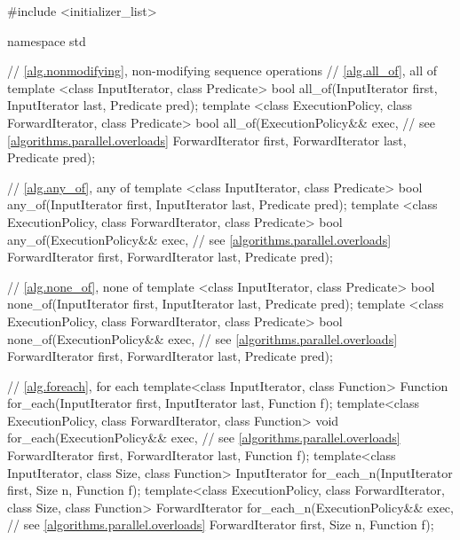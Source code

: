 \begin{codeblock}
#include <initializer_list>

namespace std {
  // \ref{alg.nonmodifying}, non-modifying sequence operations
  // \ref{alg.all_of}, all of
  template <class InputIterator, class Predicate>
    bool all_of(InputIterator first, InputIterator last, Predicate pred);
  template <class ExecutionPolicy, class ForwardIterator, class Predicate>
    bool all_of(ExecutionPolicy&& exec, // see \ref{algorithms.parallel.overloads}
                ForwardIterator first, ForwardIterator last, Predicate pred);

  // \ref{alg.any_of}, any of
  template <class InputIterator, class Predicate>
    bool any_of(InputIterator first, InputIterator last, Predicate pred);
  template <class ExecutionPolicy, class ForwardIterator, class Predicate>
    bool any_of(ExecutionPolicy&& exec, // see \ref{algorithms.parallel.overloads}
                ForwardIterator first, ForwardIterator last, Predicate pred);

  // \ref{alg.none_of}, none of
  template <class InputIterator, class Predicate>
    bool none_of(InputIterator first, InputIterator last, Predicate pred);
  template <class ExecutionPolicy, class ForwardIterator, class Predicate>
    bool none_of(ExecutionPolicy&& exec, // see \ref{algorithms.parallel.overloads}
                 ForwardIterator first, ForwardIterator last, Predicate pred);

  // \ref{alg.foreach}, for each
  template<class InputIterator, class Function>
    Function for_each(InputIterator first, InputIterator last, Function f);
  template<class ExecutionPolicy, class ForwardIterator, class Function>
    void for_each(ExecutionPolicy&& exec, // see \ref{algorithms.parallel.overloads}
                  ForwardIterator first, ForwardIterator last, Function f);
  template<class InputIterator, class Size, class Function>
    InputIterator for_each_n(InputIterator first, Size n, Function f);
  template<class ExecutionPolicy, class ForwardIterator, class Size, class Function>
    ForwardIterator for_each_n(ExecutionPolicy&& exec, // see \ref{algorithms.parallel.overloads}
                               ForwardIterator first, Size n, Function f);

}
\end{codeblock}
